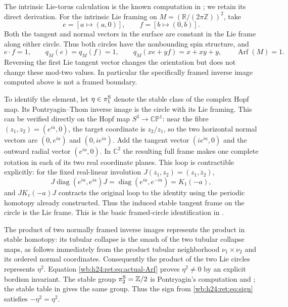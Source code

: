 The intrinsic Lie-torus calculation is the known computation in \cite[Example~3.8, p.~6]{DebrayGunningham2018Root}; we retain its direct derivation. For the intrinsic Lie framing on
\(M=(\mathbb R/(2\pi\mathbb Z))^2\), take
\[
 e=[a\mapsto(a,0)],\qquad f=[b\mapsto(0,b)].
\]
Both the tangent and normal vectors in the surface are constant in
the Lie frame along either circle.  Thus both circles have the
nonbounding spin structure, and
\begin{equation}
 e\mathbin{\cdot}f=1,\qquad q_M(e)=q_M(f)=1,
 \qquad q_M(xe+yf)=x+xy+y,
 \qquad \operatorname{Arf}(M)=1.
 \label{wb:h24:ret:eq:actual-Arf}
\end{equation}
Reversing the first Lie tangent vector changes the orientation but
does not change these mod-two values.  In particular the
specifically framed inverse image computed above is not a framed
boundary.

To identify the element, let \(\eta\in\pi_1^{\rm S}\) denote the
stable class of the complex Hopf map.  Its Pontryagin--Thom inverse
image is the circle with its Lie framing.  This can be verified
directly on the Hopf map \(S^3\to\mathbb{CP}^1\): near the fibre
\((z_1,z_2)=(e^{ia},0)\), the target coordinate is \(z_2/z_1\), so
the two horizontal normal vectors are \((0,e^{ia})\) and
\((0,ie^{ia})\).  Add the tangent vector \((ie^{ia},0)\) and the
outward radial vector \((e^{ia},0)\).  In \(\mathbb C^2\) the resulting
full frame makes one complete rotation in each of its two real
coordinate planes.  This loop is contractible explicitly: for the
fixed real-linear involution \(J(z_1,z_2)=(z_1,\overline z_2)\),
\[
 J\operatorname{diag}(e^{ia},e^{ia})J=\operatorname{diag}(e^{ia},e^{-ia})=K_1(-a),
\]
and \(JK_v(-a)J\) contracts the original loop to the identity using
the periodic homotopy already constructed.  Thus the induced stable
tangent frame on the circle is the Lie frame.  This is the basic
framed-circle identification in \cite[Theorems~20--21, pp.~96--101]{Pontryagin1955Root}.

The product of two normally framed inverse images represents the
product in stable homotopy: its tubular collapse is the smash of
the two tubular collapse maps, as follows immediately from the
product tubular neighborhood \(\nu_1\times\nu_2\) and its ordered
normal coordinates.  Consequently the product of the two Lie
circles represents \(\eta^2\).  Equation \eqref{wb:h24:ret:eq:actual-Arf}
proves \(\eta^2\ne0\) by an explicit bordism invariant.  The
stable group \(\pi_2^{\rm S}=\mathbb Z/2\) is Pontryagin's computation
\cite[pp.~957--959]{Pontryagin1950Root} and \cite[Theorem~24, pp.~109--112]{Pontryagin1955Root}; the stable table in
\cite[opening table, p.~339, and Corollary~4.24, pp.~360--361]{Hatcher2002} gives the same group.  Thus the sign from
\eqref{wb:h24:ret:eq:sign} satisfies \(-\eta^2=\eta^2\).

